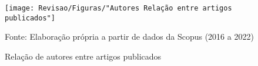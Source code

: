 \begin{figure}[H]
	\centering
	\caption{Relação de autores entre artigos publicados}
	\label{fig:autores-relacao-entre-artigos-publicados}
	\texttt{[image: Revisao/Figuras/"Autores Relação entre artigos publicados"]}
	\vspace{0.2cm}
	
	Fonte: Elaboração própria a partir de dados da Scopus (2016 a 2022)
\end{figure}